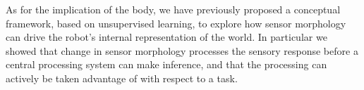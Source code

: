 \documentclass[]{interact}
\theoremstyle{plain}%
\theoremstyle{definition}
\theoremstyle{remark}
\begin{document}
As for the implication of the body, we have previously proposed a conceptual framework, based on unsupervised learning, to explore how sensor morphology can drive the robot's internal representation of the world. In particular we showed that change in sensor morphology processes the sensory response before a central processing system can make inference, and that the processing can actively be taken advantage of with respect to a task.








\end{document}
